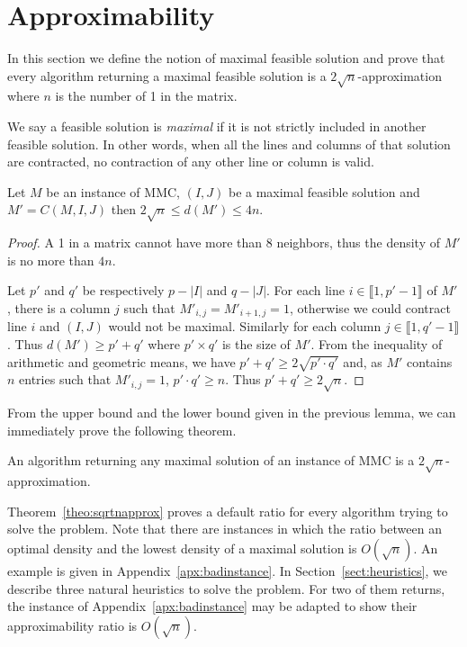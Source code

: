 \section{Approximability}
\label{sect:approx}

In this section we define the notion of maximal feasible solution and prove that every algorithm returning a maximal feasible solution is a $2\sqrt{n}$-approximation where $n$ is the number of 1 in the matrix.

\begin{definition}
We say a feasible solution is \emph{maximal} if it is not strictly included in another feasible solution. In other words, when all the lines and columns of that solution are contracted, no contraction of any other line or column is valid.
\end{definition}

\begin{lemma}
\label{lem:bounds}
Let $M$ be an instance of MMC, $(I,J)$ be a maximal feasible solution and $M' = C(M,I,J)$ then $2 \sqrt{n} \leq d(M') \leq 4n$.
\end{lemma}
\begin{proof}
A 1 in a matrix cannot have more than $8$ neighbors, thus the density of $M'$ is no more than $4n$.

Let $p'$ and $q'$ be respectively $p - |I|$ and $q - |J|$. For each line $i \in \llbracket 1,p'-1 \rrbracket$ of $M'$, there is a column $j$ such that $M'_{i,j} = M'_{i+1,j} = 1$, otherwise we could contract line $i$ and $(I,J)$ would not be maximal. Similarly for each column $j \in \llbracket 1,q'-1 \rrbracket$. Thus $d(M') \geq p'+q'$ where $p' \times q'$ is the size of $M'$. From the inequality of arithmetic and geometric means, we have $p' + q ' \geq 2 \sqrt{p'\cdot q'}$ and, as $M'$ contains $n$ entries such that $M'_{i,j} = 1$, $p'\cdot q' \geq n$. Thus $p' + q ' \geq 2 \sqrt{n}$.
\end{proof}

From the upper bound and the lower bound given in the previous lemma, we can immediately prove the following theorem. 

\begin{theorem}
	\label{theo:sqrtnapprox}
An algorithm returning any maximal solution of an instance of MMC is a $2\sqrt{n}$-approximation.
\end{theorem}

Theorem~\ref{theo:sqrtnapprox} proves a default ratio for every algorithm trying to solve the problem. Note that there are instances in which the ratio between an optimal density and the lowest density of a maximal solution is $O(\sqrt{n})$. An example is given in Appendix~\ref{apx:badinstance}. In Section~\ref{sect:heuristics}, we describe three natural heuristics to solve the problem. For two of them returns, the instance of Appendix~\ref{apx:badinstance} may be adapted to show their approximability ratio is $O(\sqrt{n})$. 


